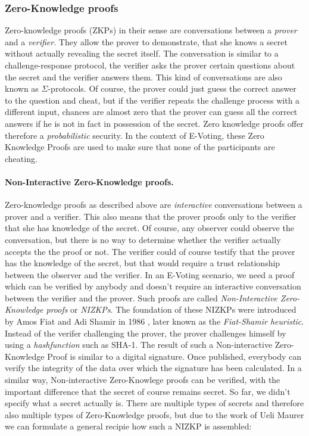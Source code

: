\documentclass[numbers=noenddot, abstract=on, a4paper, headsepline,
footsepline, oneside, draft=off]{scrreprt}
\begin{document}
\subsubsection{Zero-Knowledge proofs}
\label{sec:zeroknowledgeproofs}
Zero-knowledge proofs (ZKPs) in their sense are conversations between a
\textit{prover} and a \textit{verifier}. They allow the prover to demonstrate,
that she knows a secret without actually revealing the secret itself. The
conversation is similar to a challenge-response protocol, the verifier asks the
prover certain questions about the secret and the verifier answers them. This
kind of conversations are also known as $\Sigma$-protocols. Of course, the
prover could just guess the correct answer to the question and cheat, but if the
verifier repeats the challenge process with a different input, chances are
almost zero that the prover can guess all the correct answers if he is not in
fact in possession of the secret. Zero knowledge proofs offer therefore a
\textit{probabilistic} security. In the context of E-Voting, these Zero
Knowledge Proofs are used to make sure that none of the participants are
cheating.

\paragraph{Non-Interactive Zero-Knowledge proofs.}
Zero-knowledge proofs as described above are \textit{interactive} conversations
between a prover and a verifier. This also means that the prover proofs only to
the verifier that she has knowledge of the secret. Of course, any observer could
observe the conversation, but there is no way to determine whether the verifier
actually accepts the the proof or not. The verifier could of course testify that
the prover has the knowledge of the secret, but that would require a trust
relationship between the observer and the verifier. In an E-Voting scenario, we
need a proof which can be verified by anybody and doesn't require an interactive
conversation between the verifier and the prover. Such proofs are called
\textit{Non-Interactive Zero-Knowledge proofs} or \textit{NIZKPs}. The
foundation of these NIZKPs were introduced by Amos Fiat and Adi Shamir in 1986
\cite{FS87}, later known as the \textit{Fiat-Shamir heuristic}. Instead of the
verifer challenging the prover, the prover challenges himself by using a
\textit{hashfunction} such as SHA-1. The result of such a Non-interactive
Zero-Knowledge Proof is similar to a digital signature. Once published,
everybody can verify the integrity of the data over which the signature has been
calculated. In a similar way, Non-interactive Zero-Knowlege proofs can be
verified, with the important difference that the secret of course remains
secret. So far, we didn't specify what a secret actually is. There are multiple
types of secrets and therefore also multiple types of Zero-Knowledge proofs, but
due to the work of Ueli Maurer \cite{Maurer09} we can formulate a general
recipie how such a NIZKP is assembled:
\end{document}
